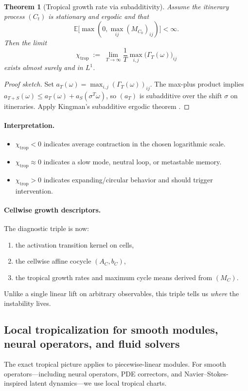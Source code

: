 \documentclass[11pt]{article}
\theoremstyle{definition}
\theoremstyle{plain}
\newtheorem{theorem}{Theorem}[section]
\theoremstyle{remark}
\newcommand{\E}{\mathbb{E}}
\begin{document}
\begin{theorem}[Tropical growth rate via subadditivity]
\label{thm:tropical-growth}
Assume the itinerary process $(C_t)$ is stationary and ergodic and that
\[
\E\bigl[\max(0,\max_{ij}(M_{C_0})_{ij})\bigr] < \infty.
\]
Then the limit
\[
\chi_{\mathrm{trop}}
\;:=\;
\lim_{T\to\infty}\frac{1}{T}\max_{i,j}\bigl(\Gamma_T(\omega)\bigr)_{ij}
\]
exists almost surely and in $L^1$.
\end{theorem}

\begin{proof}[Proof sketch]
Set $a_T(\omega)=\max_{i,j}(\Gamma_T(\omega))_{ij}$.
The max-plus product implies $a_{T+S}(\omega)\le a_T(\omega)+a_S(\sigma^T\omega)$, so $(a_T)$ is subadditive over the shift $\sigma$ on itineraries.
Apply Kingman's subadditive ergodic theorem \cite{KingmanSubadditive}.
\end{proof}

\paragraph{Interpretation.}
\begin{itemize}[leftmargin=2em]
\item $\chi_{\mathrm{trop}}<0$ indicates average contraction in the chosen logarithmic scale.
\item $\chi_{\mathrm{trop}}\approx 0$ indicates a slow mode, neutral loop, or metastable memory.
\item $\chi_{\mathrm{trop}}>0$ indicates expanding/circular behavior and should trigger intervention.
\end{itemize}

\paragraph{Cellwise growth descriptors.}
The diagnostic triple is now:
\begin{enumerate}[leftmargin=2em]
\item the activation transition kernel on cells,
\item the cellwise affine cocycle $(A_C,b_C)$,
\item the tropical growth rates and maximum cycle means derived from $(M_C)$.
\end{enumerate}
Unlike a single linear lift on arbitrary observables, this triple tells us \emph{where} the instability lives.

\subsection{Local tropicalization for smooth modules, neural operators, and fluid solvers}
The exact tropical picture applies to piecewise-linear modules.
For smooth operators---including neural operators, PDE correctors, and Navier--Stokes-inspired latent dynamics---we use local tropical charts.
\end{document}
